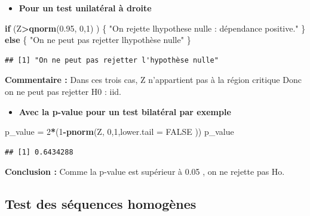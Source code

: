 \documentclass[
  12pt,
]{article}
\newenvironment{Shaded}{\begin{snugshade}}{\end{snugshade}}
\newcommand{\AttributeTok}[1]{\textcolor[rgb]{0.13,0.29,0.53}{#1}}
\newcommand{\ConstantTok}[1]{\textcolor[rgb]{0.56,0.35,0.01}{#1}}
\newcommand{\ControlFlowTok}[1]{\textcolor[rgb]{0.13,0.29,0.53}{\textbf{#1}}}
\newcommand{\DecValTok}[1]{\textcolor[rgb]{0.00,0.00,0.81}{#1}}
\newcommand{\FloatTok}[1]{\textcolor[rgb]{0.00,0.00,0.81}{#1}}
\newcommand{\FunctionTok}[1]{\textcolor[rgb]{0.13,0.29,0.53}{\textbf{#1}}}
\newcommand{\NormalTok}[1]{#1}
\newcommand{\OtherTok}[1]{\textcolor[rgb]{0.56,0.35,0.01}{#1}}
\newcommand{\SpecialCharTok}[1]{\textcolor[rgb]{0.81,0.36,0.00}{\textbf{#1}}}
\newcommand{\StringTok}[1]{\textcolor[rgb]{0.31,0.60,0.02}{#1}}
\providecommand{\tightlist}{%
  \setlength{\itemsep}{0pt}\setlength{\parskip}{0pt}}
\begin{document}
\begin{itemize}
\tightlist
\item
  \textbf{Pour un test unilatéral à droite}
\end{itemize}

\begin{Shaded}
\begin{Highlighting}[]
\ControlFlowTok{if}\NormalTok{ (Z}\SpecialCharTok{\textgreater{}}\FunctionTok{qnorm}\NormalTok{(}\FloatTok{0.95}\NormalTok{, }\DecValTok{0}\NormalTok{,}\DecValTok{1}\NormalTok{) ) \{}
\StringTok{"On rejette l\textquotesingle{}hypothese nulle : dépendance positive."}
\NormalTok{\} }\ControlFlowTok{else}\NormalTok{ \{}
\StringTok{"On ne peut pas rejetter l\textquotesingle{}hypothèse nulle"}
\NormalTok{\}}
\end{Highlighting}
\end{Shaded}

\begin{verbatim}
## [1] "On ne peut pas rejetter l'hypothèse nulle"
\end{verbatim}

\textbf{Commentaire :} Dans ces trois cas, Z n'appartient pas à la
région critique Donc on ne peut pas rejetter H0 : iid.

\begin{itemize}
\tightlist
\item
  \textbf{Avec la p-value pour un test bilatéral par exemple}
\end{itemize}

\begin{Shaded}
\begin{Highlighting}[]
\NormalTok{p\_value }\OtherTok{=} \DecValTok{2}\SpecialCharTok{*}\NormalTok{(}\DecValTok{1}\SpecialCharTok{{-}}\FunctionTok{pnorm}\NormalTok{(Z, }\DecValTok{0}\NormalTok{,}\DecValTok{1}\NormalTok{,}\AttributeTok{lower.tail =} \ConstantTok{FALSE}\NormalTok{ ))}
\NormalTok{p\_value}
\end{Highlighting}
\end{Shaded}

\begin{verbatim}
## [1] 0.6434288
\end{verbatim}

\textbf{Conclusion :} Comme la p-value est supérieur à 0.05 , on ne
rejette pas Ho.

\subsection{Test des séquences
homogènes}\label{test-des-suxe9quences-homoguxe8nes}
\end{document}
